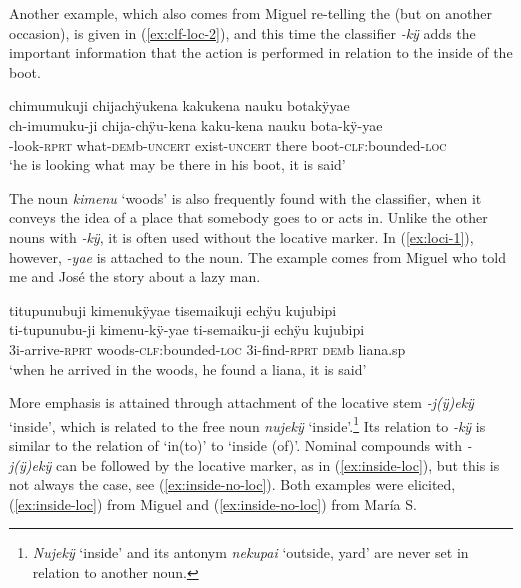 Another example, which also comes from Miguel re-telling the  (but on another occasion), is given in (\ref{ex:clf-loc-2}), and this time the classifier \textit{-kÿ} adds the important information that the action is performed in relation to the inside of the boot.

\ea\label{ex:clf-loc-2}
\begingl
\glpreamble chimumukuji chijachÿukena kakukena nauku botakÿyae\\
\gla ch-imumuku-ji chija-chÿu-kena kaku-kena nauku bota-kÿ-yae\\
-look-\textsc{rprt} what-\textsc{dem}b-\textsc{uncert} exist-\textsc{uncert} there boot-\textsc{clf:}bounded-\textsc{loc}\\
\glft ‘he is looking what may be there in his boot, it is said’
\endgl
\trailingcitation{[mtx-a110906l.043-046]}
\xe

The noun \textit{kimenu} ‘woods’ is also frequently found with the classifier, when it conveys the idea of a place that somebody goes to or acts in. Unlike the other nouns with \textit{-kÿ}, it is often used without the locative marker. In (\ref{ex:loci-1}), however, \textit{-yae} is attached to the noun. The example comes from Miguel who told me and José the story about a lazy man.

\ea\label{ex:loci-1}
\begingl
\glpreamble titupunubuji kimenukÿyae tisemaikuji echÿu kujubipi\\
\gla ti-tupunubu-ji kimenu-kÿ-yae ti-semaiku-ji echÿu kujubipi\\
\glb 3i-arrive-\textsc{rprt} woods-\textsc{clf:}bounded-\textsc{loc} 3i-find-\textsc{rprt} \textsc{dem}b liana.sp\\
\glft ‘when he arrived in the woods, he found a liana, it is said’
\endgl
\trailingcitation{[mox-n110920l.025]}
\xe
{}

More emphasis is attained through attachment of the locative stem \textit{-j(ÿ)ekÿ} ‘inside’, which is related to the free noun \textit{nujekÿ} ‘inside’.\footnote{\textit{Nujekÿ} ‘inside’ and its antonym \textit{nekupai} ‘outside, yard’ are never set in relation to another noun.} Its relation to \textit{-kÿ} is similar to the relation of ‘in(to)’ to ‘inside (of)’. Nominal compounds with \textit{-j(ÿ)ekÿ} can be followed by the locative marker, as in (\ref{ex:inside-loc}), but this is not always the case, see (\ref{ex:inside-no-loc}). Both examples were elicited, (\ref{ex:inside-loc}) from Miguel and (\ref{ex:inside-no-loc}) from María S.

